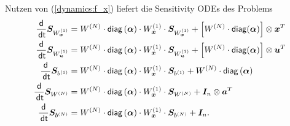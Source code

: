 \documentclass[a4paper, 12pt]{scrartcl}
\newcommand{\dt}{\thinspace \mathsf{dt}}
\begin{document}
Nutzen von (\ref{dynamics:f_x}) liefert die Sensitivity ODEs des Problems
\begin{align*}
    \frac{\mathsf{d}}{\dt} \bm{S}_{W_{\bm{x}}^{(1)}} 
    &= 
    W^{(N)} \cdot \mathsf{diag}\left(\bm{\alpha}\right) \cdot W_{\bm{x}}^{(1)}
    \cdot 
    \bm{S}_{W_{\bm{x}}^{(1)}} 
    +
    \left[W^{(N)} \cdot \mathsf{diag}(\bm{\alpha})\right] \otimes \bm{x}^T
    \\
    \frac{\mathsf{d}}{\dt} \bm{S}_{W_{\bm{u}}^{(1)}} 
    &= 
    W^{(N)} \cdot \mathsf{diag}\left(\bm{\alpha}\right) \cdot W_{\bm{x}}^{(1)}
    \cdot 
    \bm{S}_{W_{\bm{u}}^{(1)}} 
    +
    \left[W^{(N)} \cdot \mathsf{diag}(\bm{\alpha})\right] \otimes \bm{u}^T
    \\
    \frac{\mathsf{d}}{\dt} \bm{S}_{b^{(1)}} 
    &= 
    W^{(N)} \cdot \mathsf{diag}\left(\bm{\alpha}\right) \cdot W_{\bm{x}}^{(1)}
    \cdot 
    \bm{S}_{b^{(1)}} 
    +
    W^{(N)} \cdot \mathsf{diag}\left(\bm{\alpha}\right)
    \\
    \frac{\mathsf{d}}{\dt} \bm{S}_{W^{(N)}} 
    &= 
    W^{(N)} \cdot \mathsf{diag}\left(\bm{\alpha}\right) \cdot W_{\bm{x}}^{(1)}
    \cdot 
    \bm{S}_{W^{(N)}} 
    +
    \bm{I}_n \otimes \bm{a}^T
    \\
    \frac{\mathsf{d}}{\dt} \bm{S}_{b^{(N)}} 
    &= 
    W^{(N)} \cdot \mathsf{diag}\left(\bm{\alpha}\right) \cdot W_{\bm{x}}^{(1)}
    \cdot 
    \bm{S}_{b^{(N)}} 
    +
    \bm{I}_n.
\end{align*}
\end{document}
